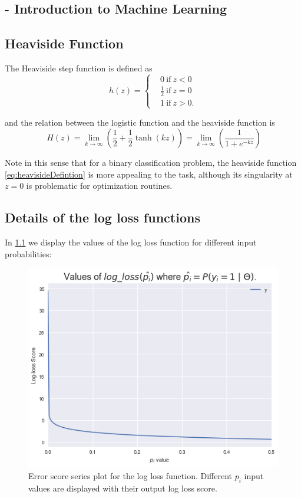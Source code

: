 \begin{appendices}
\chapter{- Introduction to Machine Learning}\label{appx:introMachineLearning}

\section{Heaviside Function}\label{appx:sec:heaviside}

The Heaviside step function is defined as
\begin{equation}\label{eq:heavisideDefintion}
h(z) =
\begin{cases}
&0 \ \mbox{if} \ z<0 \\
&\frac{1}{2} \ \mbox{if} \ z=0 \\
&1 \ \mbox{if} \ z>0.
\end{cases}
\end{equation}

and the relation between the logistic function and the heaviside function is
\begin{equation}
 \ H(z) = \lim_{k \to \infty} \left(\frac{1}{2} + \frac{1}{2}\tanh(kz) \right) = \lim_{k \to \infty} \left(\frac{1}{1+e^{-kz}} \right)
\end{equation}

Note in this sense that for a binary classification problem, the heaviside function \cref{eq:heavisideDefintion} is more appealing to the task, although its singularity at $z=0$ is problematic for optimization routines.

\section{Details of the log loss functions}\label{appx:sec:loglossDetails}

In \cref{figure-logLossValues} we display the values of the log loss function for different input probabilities:

\begin{figure}[h!]
\begin{center}
\includegraphics[width=0.7\columnwidth]{figures/logloss/figure-logLossValues.png}
\caption{ Error score series plot for the log loss function.
Different $p_i$ input values are displayed with their output log loss score.}
\label{figure-logLossValues}
\end{center}
\end{figure}


\end{appendices}
